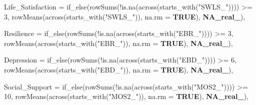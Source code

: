\documentclass[
  bookmarksnumbered]{article}
\newenvironment{Shaded}{\begin{snugshade}}{\end{snugshade}}
\newcommand{\AttributeTok}[1]{\textcolor[rgb]{0.80,0.80,0.80}{#1}}
\newcommand{\ConstantTok}[1]{\textcolor[rgb]{0.86,0.64,0.64}{\textbf{#1}}}
\newcommand{\DecValTok}[1]{\textcolor[rgb]{0.86,0.86,0.80}{#1}}
\newcommand{\FunctionTok}[1]{\textcolor[rgb]{0.94,0.94,0.56}{#1}}
\newcommand{\NormalTok}[1]{\textcolor[rgb]{0.80,0.80,0.80}{#1}}
\newcommand{\SpecialCharTok}[1]{\textcolor[rgb]{0.86,0.64,0.64}{#1}}
\newcommand{\StringTok}[1]{\textcolor[rgb]{0.80,0.58,0.58}{#1}}
\begin{document}
\begin{Shaded}
\begin{Highlighting}[]
    \AttributeTok{Life\_Satisfaction =} \FunctionTok{if\_else}\NormalTok{(}\FunctionTok{rowSums}\NormalTok{(}\SpecialCharTok{!}\FunctionTok{is.na}\NormalTok{(}\FunctionTok{across}\NormalTok{(}\FunctionTok{starts\_with}\NormalTok{(}\StringTok{"SWLS\_"}\NormalTok{)))) }\SpecialCharTok{\textgreater{}=} \DecValTok{3}\NormalTok{,}
                                \FunctionTok{rowMeans}\NormalTok{(}\FunctionTok{across}\NormalTok{(}\FunctionTok{starts\_with}\NormalTok{(}\StringTok{"SWLS\_"}\NormalTok{)), }\AttributeTok{na.rm =} \ConstantTok{TRUE}\NormalTok{),}
                                \ConstantTok{NA\_real\_}\NormalTok{),}
    
    \AttributeTok{Resilience =} \FunctionTok{if\_else}\NormalTok{(}\FunctionTok{rowSums}\NormalTok{(}\SpecialCharTok{!}\FunctionTok{is.na}\NormalTok{(}\FunctionTok{across}\NormalTok{(}\FunctionTok{starts\_with}\NormalTok{(}\StringTok{"EBR\_"}\NormalTok{)))) }\SpecialCharTok{\textgreater{}=} \DecValTok{3}\NormalTok{,}
                         \FunctionTok{rowMeans}\NormalTok{(}\FunctionTok{across}\NormalTok{(}\FunctionTok{starts\_with}\NormalTok{(}\StringTok{"EBR\_"}\NormalTok{)), }\AttributeTok{na.rm =} \ConstantTok{TRUE}\NormalTok{),}
                         \ConstantTok{NA\_real\_}\NormalTok{),}
    
    \AttributeTok{Depression =} \FunctionTok{if\_else}\NormalTok{(}\FunctionTok{rowSums}\NormalTok{(}\SpecialCharTok{!}\FunctionTok{is.na}\NormalTok{(}\FunctionTok{across}\NormalTok{(}\FunctionTok{starts\_with}\NormalTok{(}\StringTok{"EBD\_"}\NormalTok{)))) }\SpecialCharTok{\textgreater{}=} \DecValTok{6}\NormalTok{,}
                         \FunctionTok{rowMeans}\NormalTok{(}\FunctionTok{across}\NormalTok{(}\FunctionTok{starts\_with}\NormalTok{(}\StringTok{"EBD\_"}\NormalTok{)), }\AttributeTok{na.rm =} \ConstantTok{TRUE}\NormalTok{),}
                         \ConstantTok{NA\_real\_}\NormalTok{),}
    
    \AttributeTok{Social\_Support =} \FunctionTok{if\_else}\NormalTok{(}\FunctionTok{rowSums}\NormalTok{(}\SpecialCharTok{!}\FunctionTok{is.na}\NormalTok{(}\FunctionTok{across}\NormalTok{(}\FunctionTok{starts\_with}\NormalTok{(}\StringTok{"MOS2\_"}\NormalTok{)))) }\SpecialCharTok{\textgreater{}=} \DecValTok{10}\NormalTok{,}
                             \FunctionTok{rowMeans}\NormalTok{(}\FunctionTok{across}\NormalTok{(}\FunctionTok{starts\_with}\NormalTok{(}\StringTok{"MOS2\_"}\NormalTok{)), }\AttributeTok{na.rm =} \ConstantTok{TRUE}\NormalTok{),}
                             \ConstantTok{NA\_real\_}\NormalTok{),}
    

\end{Highlighting}
\end{Shaded}
\end{document}

